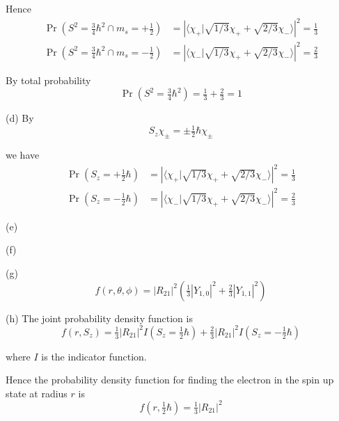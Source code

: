 Hence
\begin{align*}
\Pr\left(S^2=\tfrac{3}{4}\hbar^2\cap m_s=+\tfrac{1}{2}\right)
&=\left|\langle\chi_+|\sqrt{1/3}\chi_++\sqrt{2/3}\chi_-\rangle\right|^2=\tfrac{1}{3}
\\[1ex]
\Pr\left(S^2=\tfrac{3}{4}\hbar^2\cap m_s=-\tfrac{1}{2}\right)
&=\left|\langle\chi_-|\sqrt{1/3}\chi_++\sqrt{2/3}\chi_-\rangle\right|^2=\tfrac{2}{3}
\end{align*}

By total probability
\begin{equation*}
\Pr\left(S^2=\tfrac{3}{4}\hbar^2\right)=\tfrac{1}{3}+\tfrac{2}{3}=1
\end{equation*}

(d) By
\begin{equation*}
S_z\chi_\pm=\pm\tfrac{1}{2}\hbar\chi_\pm
\end{equation*}

we have
\begin{align*}
\Pr\left(S_z=+\tfrac{1}{2}\hbar\right)
&=\left|\langle\chi_+|\sqrt{1/3}\chi_++\sqrt{2/3}\chi_-\rangle\right|^2=\tfrac{1}{3}
\\[1ex]
\Pr\left(S_z=-\tfrac{1}{2}\hbar\right)
&=\left|\langle\chi_-|\sqrt{1/3}\chi_++\sqrt{2/3}\chi_-\rangle\right|^2=\tfrac{2}{3}
\end{align*}

(e)

\bigskip
(f)

\bigskip
(g)
\begin{equation*}
f(r,\theta,\phi)=|R_{21}|^2\left(\tfrac{1}{3}|Y_{1,0}|^2+\tfrac{2}{3}|Y_{1,1}|^2\right)
\end{equation*}

(h) The joint probability density function is
\begin{equation*}
f(r,S_z)=\tfrac{1}{3}|R_{21}|^2I\left(S_z=\tfrac{1}{2}\hbar\right)
+\tfrac{2}{3}|R_{21}|^2I\left(S_z=-\tfrac{1}{2}\hbar\right)
\end{equation*}

where $I$ is the indicator function.

\bigskip
Hence the probability density function for finding the electron in the
spin up state at radius $r$ is
\begin{equation*}
f\left(r,\tfrac{1}{2}\hbar\right)=\tfrac{1}{3}|R_{21}|^2
\end{equation*}


